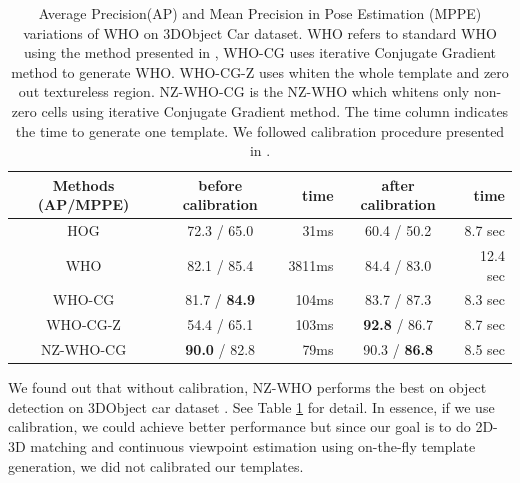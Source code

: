 \documentclass[10pt,twocolumn,letterpaper]{article}
\begin{document}
\begin{table}[!htbp]
    \footnotesize
    \begin{center}
\begin{tabular}{|c|c|r|c|r|}
\hline
Methods (AP/MPPE) & before calibration  & time & after calibration \cite{Aubry14} & time \\
\hline\hline
HOG\cite{Dalal05}     & 72.3 / 65.0           &  31ms  & 60.4 / 50.2                 & 8.7 sec \\ 
WHO\cite{Hariharan12} & 82.1 / 85.4           &  3811ms& 84.4 / 83.0                 & 12.4 sec  \\
WHO-CG                & 81.7 / \textbf{84.9}  &  104ms & 83.7 / 87.3                 & 8.3 sec \\
WHO-CG-Z              & 54.4 / 65.1           &  103ms & \textbf{92.8} / 86.7        & 8.7 sec  \\
NZ-WHO-CG             & \textbf{90.0} / 82.8  &   79ms & 90.3 / \textbf{86.8}        & 8.5 sec   \\
\hline
\end{tabular}
\end{center}
\caption{Average Precision(AP) and Mean Precision in Pose Estimation (MPPE) \cite{Lopez-Sastre11} variations of WHO on 3DObject Car dataset\cite{Savarese07}. WHO refers to standard WHO using the method presented in \cite{Hariharan12}, WHO-CG uses iterative Conjugate Gradient method to generate WHO. WHO-CG-Z uses whiten the whole template and zero out textureless region. NZ-WHO-CG is the NZ-WHO which whitens only non-zero cells using iterative Conjugate Gradient method. The time column indicates the time to generate one template. We followed calibration procedure presented in \cite{Aubry14}.}
\label{tab:who_initializations}
\end{table}

We found out that without calibration, NZ-WHO performs the best on object
detection on 3DObject car dataset \cite{Savarese07}. See Table
\ref{tab:who_initializations} for detail. In essence, if we use calibration, we
could achieve better performance but since our goal is to do 2D-3D matching and
continuous viewpoint estimation using on-the-fly template generation, we did not
calibrated our templates.
\end{document}
